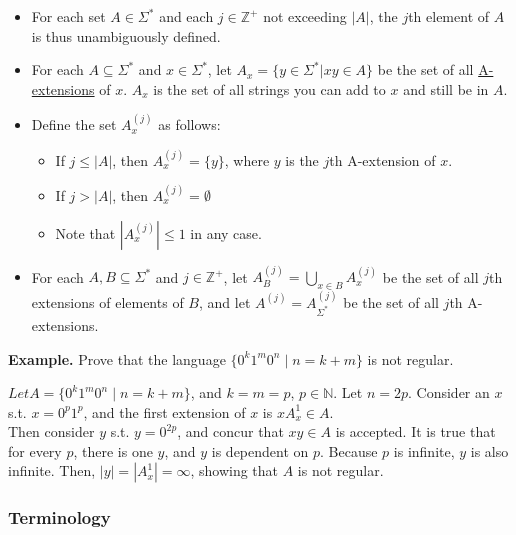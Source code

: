\documentclass[11pt]{article}
\begin{document}
\begin{itemize}
\item For each set $A\in\Sigma^*$ and each $j\in\mathbb{Z}^+$ not exceeding $|A|$, the $j$th element of $A$ is thus unambiguously defined. 
\item For each $A\subseteq\Sigma^*$ and $x\in\Sigma^*$, let $A_x =\{y\in\Sigma^*|xy\in A\}$ be the set of all \underline{A-extensions} of $x$. $A_x$ is the set of all strings you can add to $x$ and still be in $A$.
\item Define the set $A_x^{(j)}$ as follows:
\begin{itemize}
\item If $j\leqslant |A|$, then $A_x^{(j)}=\{y\}$, where $y$ is the $j$th A-extension of $x$.
\item If $j>|A|$, then $A_x^{(j)}=\emptyset$
\item Note that $|A_x^{(j)}|\leqslant 1$ in any case.
\end{itemize}
\item For each $A,B\subseteq\Sigma^*$ and $j\in\mathbb{Z}^+$, let $A_B^{(j)} = \bigcup\limits_{x\in B}A_x^{(j)}$ be the set of all $j$th extensions of elements of $B$, and let $A^{(j)}=A_{\Sigma^*}^{(j)}$ be the set of all $j$th A-extensions.
\end{itemize}

{\bf Example.} Prove that the language $\{0^k1^m0^n\mid n=k+m\}$ is not regular.

$Let A = \{0^k1^m0^n\mid n=k+m\}$, and $k=m=p$, $p\in\mathbb{N}$. Let $n=2p$. Consider an $x$ s.t. $x=0^p1^p$, and the first extension of $x$ is $xA^{1}_{x}\in A$. \\
Then consider $y$ s.t. $y=0^{2p}$, and concur that $xy\in{A}$ is accepted. It is true that for every $p$, there is one $y$, and $y$ is dependent on $p$. Because $p$ is infinite, $y$ is also infinite. Then, $|y|=|A^{1}_{x}|=\infty$, showing that $A$ is not regular. \\

\subsubsection{Terminology}
\end{document}
